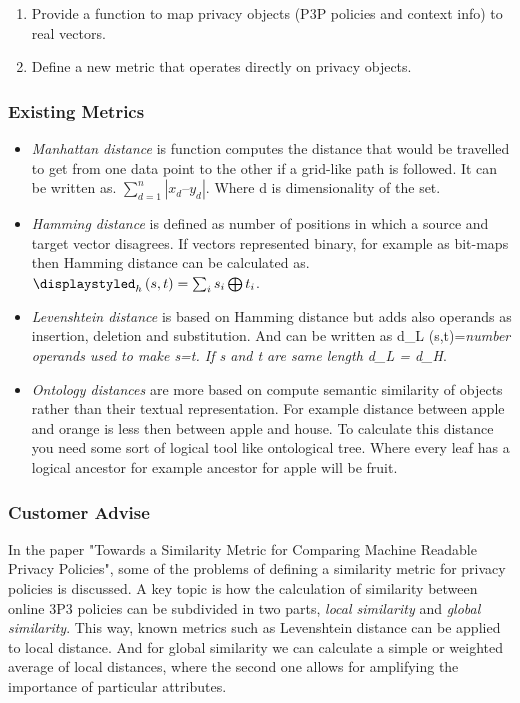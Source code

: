 \begin{enumerate}
\item Provide a function to map privacy objects (P3P policies and context info) to real vectors.
\item Define a new metric that operates directly on privacy objects.
\end{enumerate}
 

\subsubsection{Existing Metrics}

\begin{itemize}
\item \emph{Manhattan distance} is function computes the distance that would be travelled to get from one data point to the other if a grid-like path is followed. It can be written as. $\displaystyle\sum_{d=1}^n|x_d – y_d|$. Where d is dimensionality of the set.  
\item \emph{Hamming distance} is defined as number of positions in which a source and target vector disagrees. If vectors represented binary, for example as bit-maps then Hamming distance can be calculated as. $\displaystyled_h \left( s,t \right) = \sum_{i} s_i \bigoplus t_i $.  
\item \emph{Levenshtein distance} is based on Hamming distance but adds also operands as insertion, deletion and substitution. And can be written as d_L (s,t)=\textit{number operands used to make s=t. If s and t are same length d_L = d_H}.  
\item \emph{Ontology distances} are more based on compute semantic similarity of objects rather than their textual representation. For example distance between apple and orange is less then between apple and house. To calculate this distance you need some sort of logical tool like ontological tree. Where every leaf has a logical ancestor for example ancestor for apple will be fruit.
\end{itemize}
\subsubsection{Customer Advise}

In the paper "Towards a Similarity Metric for Comparing Machine Readable Privacy Policies", some of the problems of defining a similarity metric for privacy policies is discussed. A key topic is how the calculation of similarity between online 3P3 policies can be subdivided in two parts, \emph{local similarity} and \emph{global similarity}. This way, known metrics such as Levenshtein distance  can be applied to local distance. And for global similarity we can calculate a simple or weighted average of local distances, where the second one allows for amplifying the importance of particular attributes.

